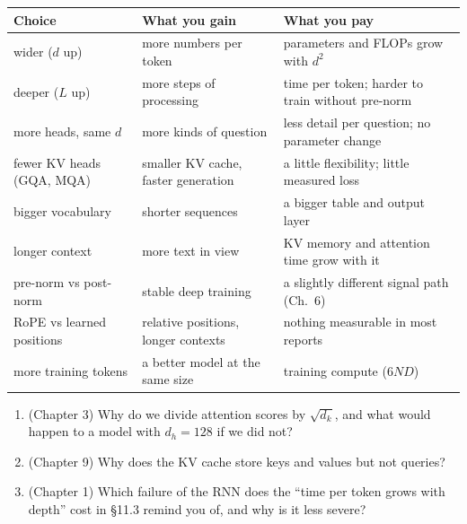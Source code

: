 \begin{center}
\small
\begin{tabular}{@{}P{3.2cm} P{5.4cm} P{5.4cm}@{}}
\toprule
Choice & What you gain & What you pay\\
\midrule
wider ($d$ up) & more numbers per token & parameters and FLOPs grow with $d^2$\\
deeper ($L$ up) & more steps of processing & time per token; harder to train without pre-norm\\
more heads, same $d$ & more kinds of question & less detail per question; no parameter change\\
fewer KV heads (GQA, MQA) & smaller KV cache, faster generation & a little flexibility; little measured loss\\
bigger vocabulary & shorter sequences & a bigger table and output layer\\
longer context & more text in view & KV memory and attention time grow with it\\
pre-norm vs post-norm & stable deep training & a slightly different signal path (Ch.\ 6)\\
RoPE vs learned positions & relative positions, longer contexts & nothing measurable in most reports\\
more training tokens & a better model at the same size & training compute ($6ND$)\\
\bottomrule
\end{tabular}
\end{center}


\begin{lookingback}
\begin{enumerate}[label=\arabic*.,leftmargin=1.6em]
\item (Chapter 3) Why do we divide attention scores by $\sqrt{d_k}$, and what would happen to a model with
$d_h=128$ if we did not?
\item (Chapter 9) Why does the KV cache store keys and values but not queries?
\item (Chapter 1) Which failure of the RNN does the ``time per token grows with depth'' cost in \S11.3
remind you of, and why is it less severe?
\end{enumerate}
\end{lookingback}

